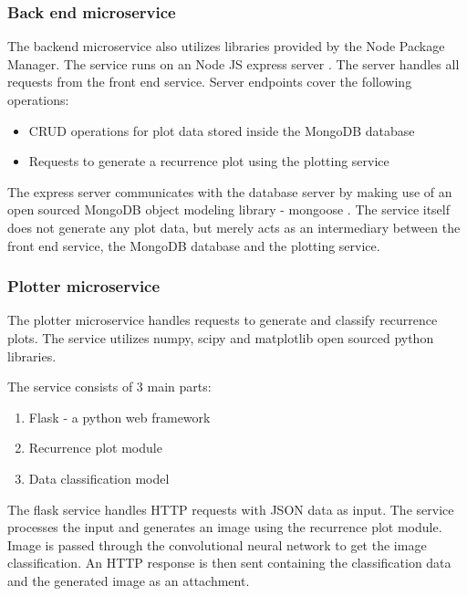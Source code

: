 \documentclass[a4paper,12pt,fleqn]{article}
\begin{document}
\subsubsection{Back end microservice}
The backend microservice also utilizes libraries provided by the Node Package Manager. 
The service runs on an Node JS express server \cite{express}.
The server handles all requests from the front end service.
Server endpoints cover the following operations:
\begin{itemize}
  \item CRUD operations for plot data stored inside the MongoDB database
  \item Requests to generate a recurrence plot using the plotting service
\end{itemize}
The express server communicates with the database server by making use of an open sourced MongoDB object modeling library - mongoose \cite{mongoose}.
The service itself does not generate any plot data, but merely acts as an intermediary between the front end service, the MongoDB database and the plotting service.


\subsubsection{Plotter microservice}
\label{sec:plotter_microservice}
The plotter microservice handles requests to generate and classify recurrence plots. 
The service utilizes numpy\cite{numpy}, scipy\cite{scipy} and matplotlib\cite{matplotlib} open sourced python libraries.

The service consists of 3 main parts:
\begin{enumerate}
  \item Flask - a python web framework
  \item Recurrence plot module
  \item Data classification model
\end{enumerate}
The flask service handles HTTP requests with JSON data as input.
The service processes the input and generates an image using the recurrence plot module.
Image is passed through the convolutional neural network to get the image classification.
An HTTP response is then sent containing the classification data and the generated image as an attachment.


\end{document}
